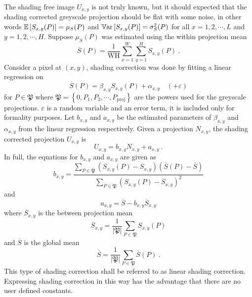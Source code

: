 The shading free image $U_{x,y}$ is not truly known, but it should expected that the shading corrected greyscale projection should be flat with some noise, in other words $\operatorname{\mathbb{E}}\left[S_{x,y}(P)\right]=\mu_{S}(P)$ and $\operatorname{\mathbb{V}ar}\left[S_{x,y}(P)\right]=\sigma_{S}^2(P)$ for all $x=1,2,\cdots,L$ and $y=1,2,\cdots,H$. Suppose $\mu_{S}(P)$ was estimated using the within projection mean
\begin{equation}
\overline{S}(P) = \dfrac{1}{\text{WH}}
\sum_{x=1}^W\sum_{y=1}^H S_{x,y}(P) \ .
\end{equation}
Consider a pixel at $(x,y)$, shading correction was done by fitting a linear regression on
\begin{equation}
\overline{S}(P) = \beta_{x,y} S_{x,y}(P) + \alpha_{x,y} \quad(+\varepsilon)
\end{equation}
for $P\in \mathfrak{P}$ where $\mathfrak{P} = \left\{0,P_1,P_2,\cdots, P_\text{proj}\right\}$ are the powers used for the greyscale projections. $\varepsilon$ is a random variable and an error term, it is included only for formality purposes. Let $b_{x,y}$ and $a_{x,y}$ be the estimated parameters of $\beta_{x,y}$ and $\alpha_{x,y}$ from the linear regression respectively. Given a projection $N_{x,y}$, the shading corrected projection $U_{x,y}$ is
\begin{equation}
U_{x,y} = b_{x,y} N_{x,y} + a_{x,y} \ .
\end{equation}
In full, the equations for $b_{x,y}$ and $a_{x,y}$ are given as
\begin{equation}
b_{x,y} = \dfrac{
  \sum_{P\in\mathfrak{P}}(S_{x,y}(P) - \overline{S}_{x,y})(\overline{S}(P) - \overline{S})
}{
  \sum_{P\in\mathfrak{P}}(S_{x,y}(P) - \overline{S}_{x,y})^2
}
\end{equation}
and
\begin{equation}
a_{x,y} = \overline{S} - b_{x,y}\overline{S}_{x,y}
\end{equation}
where $\overline{S}_{x,y}$ is the between projection mean
\begin{equation}
\overline{S}_{x,y} = \dfrac{1}{|\mathfrak{P}|}\sum_{P\in\mathfrak{P}}S_{x,y}(P)
\end{equation}
and $\overline{S}$ is the global mean
\begin{equation}
\overline{S} = \dfrac{1}{|\mathfrak{P}|}\sum_{P\in\mathfrak{P}}\overline{S}(P) \ .
\end{equation}
This type of shading correction shall be referred to as linear shading correction. Expressing shading correction in this way has the advantage that there are no user defined constants.

